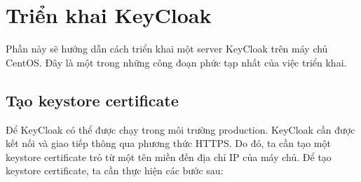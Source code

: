 \chapter{Triển khai KeyCloak}
\label{Chapter2}
Phần này sẽ hướng dẫn cách triển khai một server KeyCloak trên máy chủ CentOS. Đây là một trong những công đoạn phức tạp nhất của việc triển khai.

\section{Tạo keystore certificate}
Để KeyCloak có thể được chạy trong môi trường production. KeyCloak cần được kết nối và giao tiếp thông qua phương thức HTTPS. Do đó, ta cần tạo một keystore certificate trỏ từ
một tên miền đến địa chỉ IP của máy chủ. Để tạo keystore certificate, ta cần thực hiện các bước sau:
